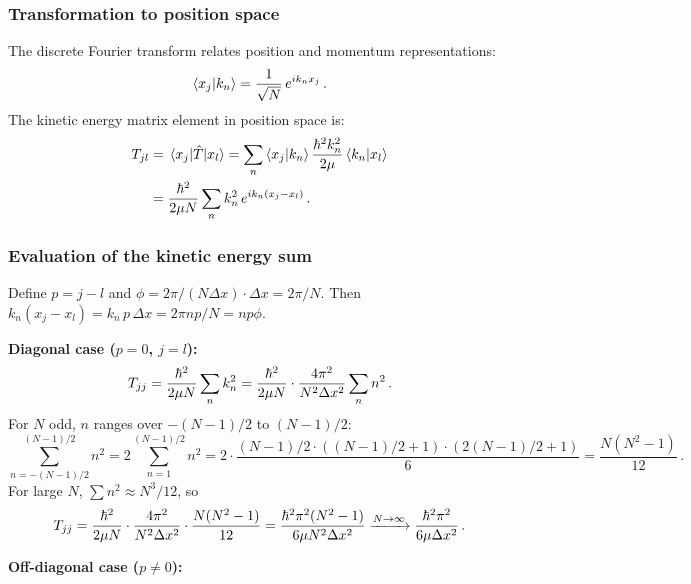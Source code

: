 \subsubsection{Transformation to position space}

The discrete Fourier transform relates position and momentum representations:
\begin{equation}
  \braket{x_j}{k_n} = \frac{1}{\sqrt{N}}\,e^{ik_n x_j}\,.
\end{equation}
The kinetic energy matrix element in position space is:
\begin{align}\label{eq:T_DVR_sum}
  T_{jl} &= \mel{x_j}{\hat{T}}{x_l}
  = \sum_n \braket{x_j}{k_n}\frac{\hbar^2 k_n^2}{2\mu}\braket{k_n}{x_l}\notag\\
  &= \frac{\hbar^2}{2\mu N}\sum_n k_n^2\,e^{ik_n(x_j - x_l)}\,.
\end{align}

\subsubsection{Evaluation of the kinetic energy sum}

Define $p = j - l$ and $\phi = 2\pi/(N\Delta x)\cdot\Delta x = 2\pi/N$. Then
$k_n(x_j - x_l) = k_n\,p\,\Delta x = 2\pi np/N = np\phi$.

\textbf{Diagonal case ($p = 0$, $j = l$):}
\begin{equation}
  T_{jj} = \frac{\hbar^2}{2\mu N}\sum_n k_n^2
  = \frac{\hbar^2}{2\mu N}\cdot\frac{4\pi^2}{N^2\Delta x^2}\sum_n n^2\,.
\end{equation}
For $N$ odd, $n$ ranges over $-(N-1)/2$ to $(N-1)/2$:
\begin{equation}
  \sum_{n=-(N-1)/2}^{(N-1)/2}n^2 = 2\sum_{n=1}^{(N-1)/2}n^2
  = 2\cdot\frac{(N-1)/2\cdot((N-1)/2+1)\cdot(2(N-1)/2+1)}{6}
  = \frac{N(N^2-1)}{12}\,.
\end{equation}
For large $N$, $\sum n^2 \approx N^3/12$, so
\begin{equation}
  T_{jj} = \frac{\hbar^2}{2\mu N}\cdot\frac{4\pi^2}{N^2\Delta x^2}\cdot\frac{N(N^2-1)}{12}
  = \frac{\hbar^2\pi^2(N^2-1)}{6\mu N^2\Delta x^2}
  \xrightarrow{N\to\infty}
  \frac{\hbar^2\pi^2}{6\mu\Delta x^2}\,.
\end{equation}

\textbf{Off-diagonal case ($p \neq 0$):}

